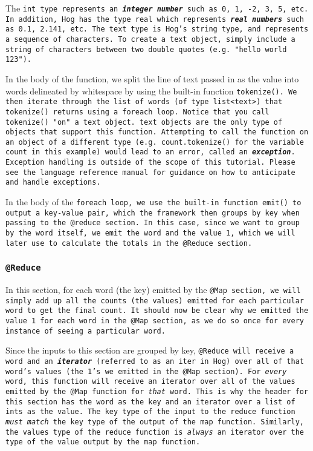 \documentclass{article} \usepackage{fancyhdr, multicol}
\begin{document}
The \tt int \rm type represents an \textbf{\emph{integer number}} such as 0, 1, -2,
3, 5, etc. In addition, Hog has the type \tt real \rm which represents
\textbf{\emph{real numbers}} such as 0.1, 2.141, etc. The \tt text \rm type is
Hog's string type, and represents a sequence of characters. To create a \tt text
\rm object, simply include a string of characters between two double quotes (e.g.
\tt "hello world 123"\rm).

In the body of the function, we split the line of text passed in as the value into
words delineated by whitespace by using the built-in function \tt tokenize()\rm. We
then iterate through the \tt list \rm of words (of type \tt list<text>\rm) that \tt
tokenize() \rm returns using a \tt foreach \rm loop. Notice that you call \tt
tokenize() \rm "on" a \tt text \rm object. \tt text \rm objects are the only type
of objects that support this function. Attempting to call the function on an object
of a different type (e.g. \tt count.tokenize() \rm for the variable \tt count \rm
in this example) would lead to an error, called an \textbf{\emph{exception}}.
Exception handling is outside of the scope of this tutorial. Please see the
language reference manual for guidance on how to anticipate and handle exceptions.

In the body of the \tt foreach \rm loop, we use the built-in function \tt emit()
\rm to output a key-value pair, which the framework then groups by key when passing
to the \tt @reduce \rm section. In this case, since we want to group by the word
itself, we emit the word and the value \tt 1\rm, which we will later use to
calculate the totals in the \tt @Reduce \rm section.

\subsubsection*{\tt @Reduce \rm}


In this section, for each word (the key) emitted by the \tt @Map \rm section, we
will simply add up all the counts (the values) emitted for each particular word to
get the final count. It should now be clear why we emitted the value \tt 1 \rm for
each word in the \tt @Map \rm section, as we do so once for every instance of
seeing a particular word.

Since the inputs to this section are grouped by key, \tt @Reduce \rm will receive a
word and an \textbf{\emph{iterator}} (referred to as an \tt iter \rm in Hog) over
all of that word's values (the \tt 1\rm's we emitted in the \tt @Map \rm section).
For \emph{every} word, this function will receive an iterator over all of the
values emitted by the \tt @Map \rm function for \emph{that} word. This is why the
header for this section has the word as the key and an iterator over a \tt list \rm
of \tt int\rm s as the value. The key type of the input to the reduce function
\emph{must match} the key type of the output of the map function. Similarly, the
values type of the reduce function is \emph{always} an iterator over the type of
the value output by the map function.
\end{document}
